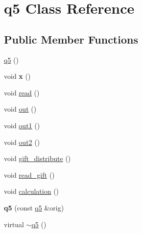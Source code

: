 \hypertarget{classq5}{\section{q5 Class Reference}
\label{classq5}
}
\subsection*{Public Member Functions}
\begin{DoxyCompactItemize}
\item 
\hyperlink{classq5_a9839ff7d3fa2609da7b90eeabc619f08}{q5} ()
\item 
\hypertarget{classq5_a5ba296a7a1f32ab3d6bb8a826e89b573}{void {\bfseries x} ()}\label{classq5_a5ba296a7a1f32ab3d6bb8a826e89b573}

\item 
void \hyperlink{classq5_a2f08d1f2c15281271ef0d8ba3529f1dc}{read} ()
\item 
void \hyperlink{classq5_a50f55c03ca7e466f546b5a6e4729744e}{out} ()
\item 
void \hyperlink{classq5_a3bc74936f5c94004e6e37687301ae7ca}{out1} ()
\item 
void \hyperlink{classq5_a82c97f6685dedd0b3e95ae81d8b03d49}{out2} ()
\item 
void \hyperlink{classq5_a615456e533eeb5bff9aa53df8760cf3b}{gift\-\_\-distribute} ()
\item 
void \hyperlink{classq5_a6bd28fac7aced7c145d6350edcdb40e8}{read\-\_\-gift} ()
\item 
void \hyperlink{classq5_afb00d989e23442560af143e9a286a803}{calculation} ()
\item 
\hypertarget{classq5_aa4c0dda3b00b0bf0d1a237d393667a00}{{\bfseries q5} (const \hyperlink{classq5}{q5} \&orig)}\label{classq5_aa4c0dda3b00b0bf0d1a237d393667a00}

\item 
virtual \hyperlink{classq5_af7a497510ab0a073989f1b6af310e66a}{$\sim$q5} ()
\end{DoxyCompactItemize}
